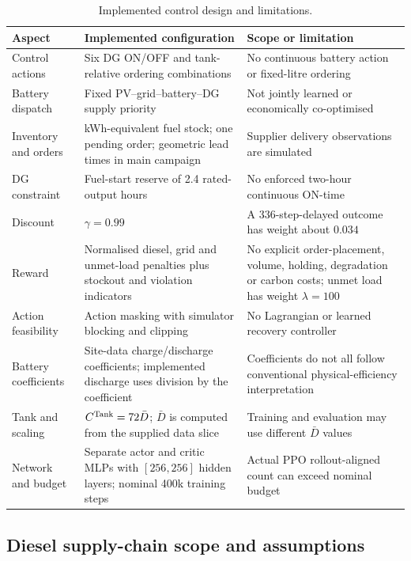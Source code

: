 \begin{table}[htbp]
\centering
\scriptsize
\setlength{\tabcolsep}{4pt}
\ifshowrevisions\color{P3Rcolor}\fi
\caption{Implemented control design and limitations.}
\label{tab:deviations}
\begin{tabularx}{\textwidth}{p{2.3cm}X X}
\toprule
\textbf{Aspect} & \textbf{Implemented configuration} & \textbf{Scope or limitation} \\
\midrule
Control actions
& Six DG ON/OFF and tank-relative ordering combinations
& No continuous battery action or fixed-litre ordering \\[3pt]
Battery dispatch
& Fixed PV--grid--battery--DG supply priority
& Not jointly learned or economically co-optimised \\[3pt]
Inventory and orders
& kWh-equivalent fuel stock; one pending order; geometric lead times in main campaign
& Supplier delivery observations are simulated \\[3pt]
DG constraint
& Fuel-start reserve of 2.4 rated-output hours
& No enforced two-hour continuous ON-time \\[3pt]
Discount
& $\gamma=0.99$
& A 336-step-delayed outcome has weight about $0.034$ \\[3pt]
Reward
& Normalised diesel, grid and unmet-load penalties plus stockout and violation indicators
& No explicit order-placement, volume, holding, degradation or carbon costs; unmet load has weight $\lambda=100$ \\[3pt]
Action feasibility
& Action masking with simulator blocking and clipping
& No Lagrangian or learned recovery controller \\[3pt]
Battery coefficients
& Site-data charge/discharge coefficients; implemented discharge uses division by the coefficient
& Coefficients do not all follow conventional physical-efficiency interpretation \\[3pt]
Tank and scaling
& $C^{\mathrm{Tank}}=72\bar D$; $\bar D$ is computed from the supplied data slice
& Training and evaluation may use different $\bar D$ values \\[3pt]
Network and budget
& Separate actor and critic MLPs with $[256,256]$ hidden layers; nominal 400k training steps
& Actual PPO rollout-aligned count can exceed nominal budget \\
\bottomrule
\end{tabularx}
\end{table}

\subsection{Diesel supply-chain scope and assumptions}
\label{sec:supply_chain_scope}

